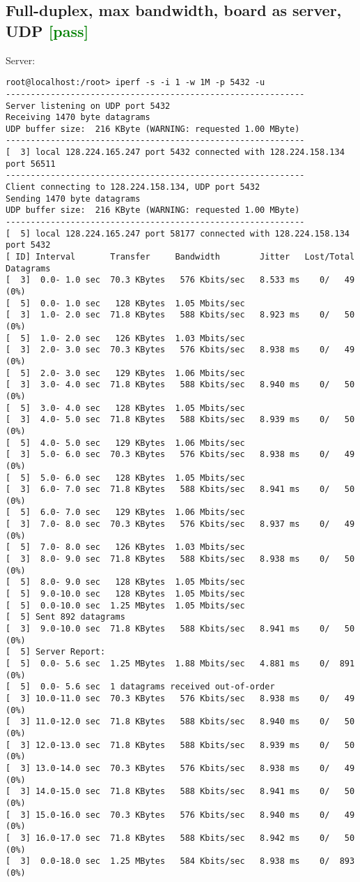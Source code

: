 \documentclass[a4paper]{report}
\begin{document}
\subsection{Full-duplex, max bandwidth, board as server, UDP \textcolor{green}{[pass]}}
Server:
\begin{lstlisting}
root@localhost:/root> iperf -s -i 1 -w 1M -p 5432 -u
------------------------------------------------------------
Server listening on UDP port 5432
Receiving 1470 byte datagrams
UDP buffer size:  216 KByte (WARNING: requested 1.00 MByte)
------------------------------------------------------------
[  3] local 128.224.165.247 port 5432 connected with 128.224.158.134 port 56511
------------------------------------------------------------
Client connecting to 128.224.158.134, UDP port 5432
Sending 1470 byte datagrams
UDP buffer size:  216 KByte (WARNING: requested 1.00 MByte)
------------------------------------------------------------
[  5] local 128.224.165.247 port 58177 connected with 128.224.158.134 port 5432
[ ID] Interval       Transfer     Bandwidth        Jitter   Lost/Total Datagrams
[  3]  0.0- 1.0 sec  70.3 KBytes   576 Kbits/sec   8.533 ms    0/   49 (0%)
[  5]  0.0- 1.0 sec   128 KBytes  1.05 Mbits/sec
[  3]  1.0- 2.0 sec  71.8 KBytes   588 Kbits/sec   8.923 ms    0/   50 (0%)
[  5]  1.0- 2.0 sec   126 KBytes  1.03 Mbits/sec
[  3]  2.0- 3.0 sec  70.3 KBytes   576 Kbits/sec   8.938 ms    0/   49 (0%)
[  5]  2.0- 3.0 sec   129 KBytes  1.06 Mbits/sec
[  3]  3.0- 4.0 sec  71.8 KBytes   588 Kbits/sec   8.940 ms    0/   50 (0%)
[  5]  3.0- 4.0 sec   128 KBytes  1.05 Mbits/sec
[  3]  4.0- 5.0 sec  71.8 KBytes   588 Kbits/sec   8.939 ms    0/   50 (0%)
[  5]  4.0- 5.0 sec   129 KBytes  1.06 Mbits/sec
[  3]  5.0- 6.0 sec  70.3 KBytes   576 Kbits/sec   8.938 ms    0/   49 (0%)
[  5]  5.0- 6.0 sec   128 KBytes  1.05 Mbits/sec
[  3]  6.0- 7.0 sec  71.8 KBytes   588 Kbits/sec   8.941 ms    0/   50 (0%)
[  5]  6.0- 7.0 sec   129 KBytes  1.06 Mbits/sec
[  3]  7.0- 8.0 sec  70.3 KBytes   576 Kbits/sec   8.937 ms    0/   49 (0%)
[  5]  7.0- 8.0 sec   126 KBytes  1.03 Mbits/sec
[  3]  8.0- 9.0 sec  71.8 KBytes   588 Kbits/sec   8.938 ms    0/   50 (0%)
[  5]  8.0- 9.0 sec   128 KBytes  1.05 Mbits/sec
[  5]  9.0-10.0 sec   128 KBytes  1.05 Mbits/sec
[  5]  0.0-10.0 sec  1.25 MBytes  1.05 Mbits/sec
[  5] Sent 892 datagrams
[  3]  9.0-10.0 sec  71.8 KBytes   588 Kbits/sec   8.941 ms    0/   50 (0%)
[  5] Server Report:
[  5]  0.0- 5.6 sec  1.25 MBytes  1.88 Mbits/sec   4.881 ms    0/  891 (0%)
[  5]  0.0- 5.6 sec  1 datagrams received out-of-order
[  3] 10.0-11.0 sec  70.3 KBytes   576 Kbits/sec   8.938 ms    0/   49 (0%)
[  3] 11.0-12.0 sec  71.8 KBytes   588 Kbits/sec   8.940 ms    0/   50 (0%)
[  3] 12.0-13.0 sec  71.8 KBytes   588 Kbits/sec   8.939 ms    0/   50 (0%)
[  3] 13.0-14.0 sec  70.3 KBytes   576 Kbits/sec   8.938 ms    0/   49 (0%)
[  3] 14.0-15.0 sec  71.8 KBytes   588 Kbits/sec   8.941 ms    0/   50 (0%)
[  3] 15.0-16.0 sec  70.3 KBytes   576 Kbits/sec   8.940 ms    0/   49 (0%)
[  3] 16.0-17.0 sec  71.8 KBytes   588 Kbits/sec   8.942 ms    0/   50 (0%)
[  3]  0.0-18.0 sec  1.25 MBytes   584 Kbits/sec   8.938 ms    0/  893 (0%)
\end{lstlisting}
\end{document}
